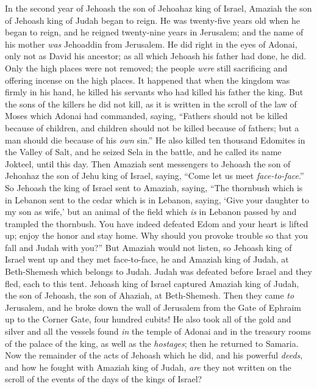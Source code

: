 \begin{biblechapter} %
 In the second year of Jehoash the son of Jehoahaz king of Israel, Amaziah the son of Jehoash king of Judah began to reign.
\verse He was twenty-five years old when he began to reign, and he reigned twenty-nine years in Jerusalem; and the name of his mother \textit{was} Jehoaddin from Jerusalem.
\verse He did right in the eyes of Adonai, only not as David his ancestor; as all which Jehoash his father had done, he did.
\verse Only the high places were not removed; the people \textit{were} still sacrificing and offering incense on the high places.
\verse It happened that when the kingdom was firmly in his hand, he killed his servants who had killed his father the king.
\verse But the sons of the killers he did not kill, as it is written in the scroll of the law of Moses which Adonai had commanded, saying, “Fathers should not be killed because of children, and children should not be killed because of fathers; but a man should die because of his \textit{own} sin.”
\verse He also killed ten thousand Edomites in the Valley of Salt, and he seized Sela in the battle, and he called its name Jokteel, until this day.
\verse Then Amaziah sent messengers to Jehoash the son of Jehoahaz the son of Jehu king of Israel, saying, “Come let us meet \textit{face-to-face}.”
\verse So Jehoash the king of Israel sent to Amaziah, saying, “The thornbush which is in Lebanon sent to the cedar which is in Lebanon, saying, ‘Give your daughter to my son as wife,’ but an animal of the field which \textit{is} in Lebanon passed by and trampled the thornbush.
\verse You have indeed defeated Edom and your heart is lifted up; enjoy the honor and stay home. Why should you provoke trouble so that you fall and Judah with you?”
\verse But Amaziah would not listen, so Jehoash king of Israel went up and they met face-to-face, he and Amaziah king of Judah, at Beth-Shemesh which belongs to Judah.
\verse Judah was defeated before Israel and they fled, each to this tent.
\verse Jehoash king of Israel captured Amaziah king of Judah, the son of Jehoash, the son of Ahaziah, at Beth-Shemesh. Then they came \textit{to} Jerusalem, and he broke down the wall of Jerusalem from the Gate of Ephraim up to the Corner Gate, four hundred cubits!
\verse He also took all of the gold and silver and all the vessels found \textit{in} the temple of Adonai and in the treasury rooms of the palace of the king, as well as the \textit{hostages}; then he returned to Samaria.
\verse Now the remainder of the acts of Jehoash which he did, and his powerful \textit{deeds}, and how he fought with Amaziah king of Judah, \textit{are} they not written on the scroll of the events of the days of the kings of Israel?

\end{biblechapter}
